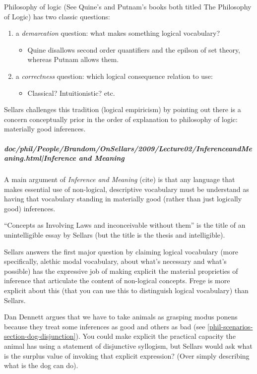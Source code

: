 \documentclass[12pt,a4paper]{report}
\begin{document}
Philosophy of logic (See Quine's and Putnam's books both titled The Philosophy
of Logic) has two classic questions:
\begin{enumerate}
    \item a \emph{demarcation} question: what makes something logical vocabulary?
     \begin{itemize}
        \item Quine disallows second order quantifiers and the epilson of set
              theory, whereas Putnam allows them.
     \end{itemize}
    \item a \emph{correctness} question: which logical consequence relation to use:
      \begin{itemize}
      \item Classical? Intuitionistic? etc.
      \end{itemize}
\end{enumerate}

Sellars challenges this tradition (logical empiricism) by pointing out there is
a concern conceptually prior in the order of explanation to philosophy of
logic: materially good inferences.

\subparagraph{doc/phil/People/Brandom/OnSellars/2009/Lecture02/InferenceandMeaning.html|Inference and Meaning}

A main argument of \textit{Inference and Meaning} (cite) is that any language that makes essential use of non-logical, descriptive vocabulary must be understand as having that vocabulary standing in materially good (rather than just logically good) inferences.

``Concepts as Involving Laws and inconceivable without them'' is the title of an unintelligible essay by Sellars (but the title is the thesis and intelligible).

Sellars answers the first major question by claiming logical vocabulary (more specifically, alethic modal vocabulary, about what's necessary and what's possible) has the expressive job of making explicit the material proprieties of inference that articulate the content of non-logical concepts. Frege is more explicit about this (that you can use this to distinguish logical vocabulary) than Sellars.

Dan Dennett argues that we have to take animals as grasping modus ponens because they treat some inferences as good and others as bad (see \ref{phil-scenarios-section-dog-disjunction}). You could make explicit the practical capacity the animal has using a statement of disjunctive syllogism, but Sellars would ask what is the surplus value of invoking that explicit expression? (Over simply describing what is the dog can do).
\end{document}
